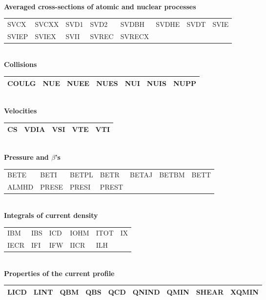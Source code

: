 \bigskip
\\
\noindent
{\bf Averaged cross-sections of atomic and nuclear processes}\\[1ex]
{\tt\begin{tabular}
{|p{13mm}p{13mm}p{13mm}p{13mm}p{13mm}p{13mm}p{13mm}p{13mm}|}	\hline
SVCX	& SVCXX	& SVD1	& SVD2	& SVDBH	& SVDHE	& SVDT	& SVIE	\\ 
SVIEP	& SVIEX	& SVII	& SVREC	& SVRECX& 	&	& \\	\hline
\end{tabular}}
\bigskip
\\
\noindent
{\bf Collisions}\\[1ex]
{\tt\begin{tabular}
{|p{13mm}p{13mm}p{13mm}p{13mm}p{13mm}p{13mm}p{13mm}|}		\hline
COULG	& NUE	& NUEE	& NUES	& NUI	& NUIS	& NUPP	\\	\hline
\end{tabular}}
\bigskip
\\
\noindent
{\bf Velocities}\nopagebreak\\[1ex]\nopagebreak
{\tt\begin{tabular}{|p{13mm}p{13mm}p{13mm}p{13mm}p{13mm}|}	\hline
CS	& VDIA	& VSI	& VTE	& VTI	\\			\hline
\end{tabular}}
\bigskip
\\
\noindent
{\bf Pressure and $\beta$'s}\\[1ex]
{\tt\begin{tabular}
{|p{13mm}p{13mm}p{13mm}	p{13mm}	p{13mm}	p{13mm}	p{13mm}|}	\hline
BETE	& BETI	& BETPL	& BETR	& BETAJ	& BETBM	& BETT	\\ 
ALMHD	& PRESE	& PRESI	& PREST	&	&	&	\\	\hline
\end{tabular}}
\bigskip
\\
\noindent
{\bf Integrals of current density}\\[1ex]
{\tt\begin{tabular}
{|p{13mm}p{13mm}p{13mm}	p{13mm}	p{13mm}	p{13mm}|}	\hline
IBM	& IBS	& ICD	& IOHM	& ITOT	& IX		\\
IECR	& IFI	& IFW	& IICR	& ILH 	&		\\	\hline
\end{tabular}}
\bigskip
\\
\noindent
{\bf Properties of the current profile}\\[1ex]
{\tt\begin{tabular}
{|p{13mm}p{13mm}p{13mm}p{13mm}p{13mm}p{13mm}p{13mm}p{13mm}p{13mm}|}
\hline
LICD	& LINT & QBM	& QBS	& QCD	& QNIND	& QMIN	& SHEAR	& XQMIN\\
\hline
\end{tabular}}
